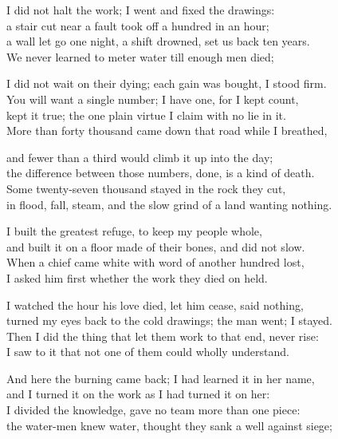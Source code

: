 \begin{founder}
I did not halt the work; I went and fixed the drawings:\\
a stair cut near a fault took off a hundred in an hour;\\
a wall let go one night, a shift drowned, set us back ten years.\\
We never learned to meter water till enough men died;\\
\medskip

I did not wait on their dying; each gain was bought, I stood firm.\\
You will want a single number; I have one, for I kept count,\\
kept it true; the one plain virtue I claim with no lie in it.\\
More than forty thousand came down that road while I breathed,\\
\medskip

and fewer than a third would climb it up into the day;\\
the difference between those numbers, done, is a kind of death.\\
Some twenty-seven thousand stayed in the rock they cut,\\
in flood, fall, steam, and the slow grind of a land wanting nothing.\\
\medskip

I built the greatest refuge, to keep my people whole,\\
and built it on a floor made of their bones, and did not slow.\\
When a chief came white with word of another hundred lost,\\
I asked him first whether the work they died on held.\\
\medskip

I watched the hour his love died, let him cease, said nothing,\\
turned my eyes back to the cold drawings; the man went; I stayed.\\
Then I did the thing that let them work to that end, never rise:\\
I saw to it that not one of them could wholly understand.\\
\medskip

And here the burning came back; I had learned it in her name,\\
and I turned it on the work as I had turned it on her:\\
I divided the knowledge, gave no team more than one piece:\\
the water-men knew water, thought they sank a well against siege;\\
\medskip


\end{founder}
